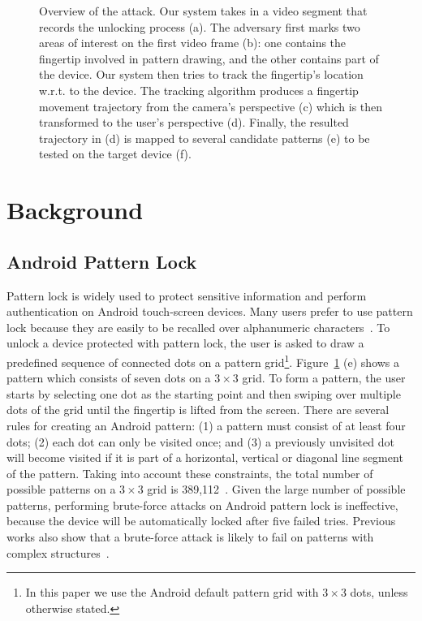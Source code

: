 \begin{figure}[!ht]
    \vspace{-8mm}
    \caption{Overview of the attack.
     Our system takes in a video segment that records the unlocking process (a). The adversary first marks two areas of interest on the first video frame (b): one contains the fingertip involved in pattern drawing, and the other contains part of the device. Our system then tries to track the fingertip's location w.r.t. to the device.
     The tracking algorithm produces a fingertip movement trajectory from the camera's perspective (c) which is then transformed to the user's perspective (d). Finally, the resulted trajectory in (d) is mapped to several candidate patterns (e) to be tested on the target device (f). }
    \label{fig:fig2}
    \vspace{-5mm}
\end{figure}

\vspace{-3mm}
\section{Background}
    \subsection{Android Pattern Lock}
    \label{section: android_pattern_lock}
        Pattern lock is widely used to protect sensitive information and perform authentication on
        Android touch-screen devices. Many users prefer to use pattern lock because they
        are easily to be recalled over alphanumeric characters~\cite{standing1970perception,Weiss2008PassShapes}.
        To unlock a device protected with pattern lock, the user is asked to draw a predefined sequence of connected dots on a pattern grid\footnote{In this paper we use the Android default pattern grid with $3 \times 3$ dots, unless otherwise stated.}.
        Figure~\ref{fig:fig2} (e) shows a pattern which consists of seven dots on a $3 \times 3$ grid.
        To form a
        pattern, the user starts by selecting one dot as the
        starting point and then swiping over multiple dots of the grid until the fingertip is lifted from the screen.
        There are several rules for creating an Android pattern: (1) a pattern must consist
        of at least four dots; (2) each dot can only be visited once; and (3) a previously unvisited dot will
        become visited if it is part of a horizontal, vertical or diagonal
        line segment of the pattern. Taking into account these constraints, the total number of possible patterns
        on a $3\times3$ grid is 389,112~\cite{uellenbeck2013quantifying}.
        Given the large number of possible patterns, performing brute-force attacks on
        Android pattern lock is ineffective, because the device will be
        automatically locked after five failed tries.
        Previous works also show that a brute-force attack is likely to fail on  patterns with complex
        structures~\cite{Kelley:2012:GAM:2310656.2310715,Mazurek2013Measuring}.

